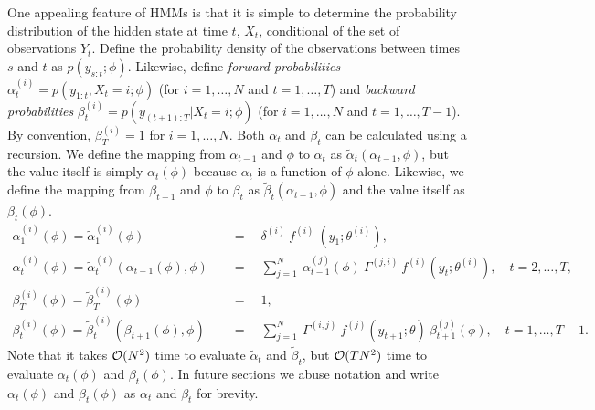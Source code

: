 One appealing feature of HMMs is that it is simple to determine the probability distribution of the hidden state at time $t$, $X_t$, conditional of the set of observations $Y_t$. Define the probability density of the observations between times $s$ and $t$ as $p(y_{s:t};\phi)$. Likewise, define \textit{forward probabilities} $\alpha^{(i)}_t = p(y_{1:t},X_t = i;\phi)$ (for $i = 1,\ldots,N$ and $t = 1,\ldots,T$) and \textit{backward probabilities} $\beta^{(i)}_t = p(y_{(t+1):T}|X_t = i;\phi)$ (for $i = 1,\ldots,N$ and $t = 1,\ldots,T-1$). By convention, $\beta^{(i)}_T = 1$ for $i = 1,\ldots,N$. Both $\alpha_t$ and $\beta_t$ can be calculated using a recursion. We define the mapping from $\alpha_{t-1}$ and $\phi$ to $\alpha_t$ as $\tilde \alpha_t(\alpha_{t-1},\phi)$, but the value itself is simply $\alpha_t(\phi)$ because $\alpha_t$ is a function of $\phi$ alone. Likewise, we define the mapping from $\beta_{t+1}$ and $\phi$ to $\beta_{t}$ as $\tilde \beta_t(\alpha_{t+1},\phi)$ and the value itself as $\beta_t(\phi)$. 
%
\begin{align}
    \alpha_1^{(i)}(\phi) = \tilde \alpha_1^{(i)}(\phi) \quad &= \quad  \delta^{(i)} ~ f^{(i)} ~ (y_1;\theta^{(i)}), \\
    \alpha_t^{(i)}(\phi) = \tilde \alpha_t^{(i)}(\alpha_{t-1}(\phi),\phi) \quad &= \quad \sum_{j=1}^N ~ \alpha_{t-1}^{(j)}(\phi) ~ \Gamma^{(j,i)} ~ f^{(i)}(y_t;\theta^{(i)}), \quad t = 2,\ldots,T, \label{eqn:alpha} \\
    \beta_T^{(i)}(\phi) = \tilde \beta_T^{(i)}(\phi) \quad &= \quad  1, \\
    \beta_t^{(i)}(\phi) = \tilde \beta_t^{(i)}(\beta_{t+1}(\phi), \phi) \quad &= \quad \sum_{j=1}^N ~ \Gamma^{(i,j)} ~ f^{(j)}(y_{t+1};\theta) ~ \beta^{(j)}_{t+1}(\phi), \quad t = 1,\ldots,T-1. \label{eqn:beta}
\end{align}
%
%
Note that it takes $\mathcal{O}(N^2)$ time to evaluate $\tilde \alpha_t$ and $\tilde \beta_t$, but $\mathcal{O}(TN^2)$ time to evaluate $\alpha_t(\phi)$ and $\beta_t(\phi)$. In future sections we abuse notation and write $\alpha_t(\phi)$ and $\beta_t(\phi)$ as $\alpha_t$ and $\beta_t$ for brevity. 


